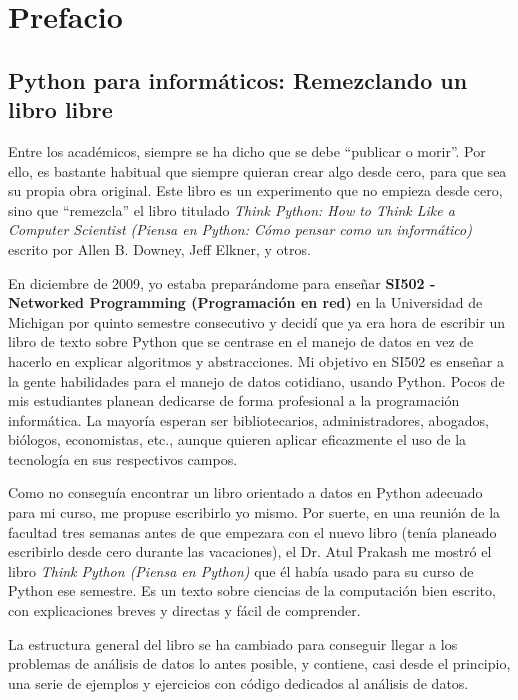 
\chapter{Prefacio}

\section*{Python para informáticos: Remezclando un libro libre}

Entre los académicos, siempre se ha dicho que se debe ``publicar o morir''.
Por ello, es bastante habitual que siempre quieran crear algo desde cero,
para que sea su propia obra original. Este libro es un
experimento que no empieza desde cero, sino que ``remezcla''
el libro titulado
\emph{Think Python: How to Think Like
a Computer Scientist (Piensa en Python: Cómo pensar como
un informático)}
escrito por Allen B. Downey, Jeff Elkner, y otros.

En diciembre de 2009, yo estaba preparándome para enseñar
{\bf SI502 - Networked Programming (Programación en red)}
en la Universidad de Michigan
por quinto semestre consecutivo y decidí que ya era hora
de escribir un libro de texto sobre Python que se centrase en el manejo de datos
en vez de hacerlo en explicar algoritmos y abstracciones.
Mi objetivo en SI502 es enseñar a la gente habilidades para
el manejo de datos cotidiano, usando Python.
Pocos de mis estudiantes planean dedicarse de forma profesional
a la programación informática. La mayoría esperan ser
bibliotecarios, administradores, abogados, biólogos, economistas, etc.,
aunque quieren aplicar eficazmente el uso de la tecnología en sus respectivos campos.

Como no conseguía encontrar un libro orientado a datos en Python
adecuado para mi curso, me propuse escribirlo yo mismo.
Por suerte, en una reunión de la facultad tres semanas
antes de que empezara con el nuevo libro (tenía planeado
escribirlo desde cero durante las vacaciones),
el Dr. Atul Prakash me mostró el libro \emph{Think Python (Piensa en Python)}
que él había usado para su curso de Python ese semestre.
Es un texto sobre ciencias de la computación bien escrito,
con explicaciones breves y directas y fácil de comprender.

La estructura general del libro
se ha cambiado para conseguir llegar a los problemas de análisis de datos
lo antes posible, y contiene, casi desde el principio, una serie de ejemplos
y ejercicios con código dedicados al análisis de datos.

